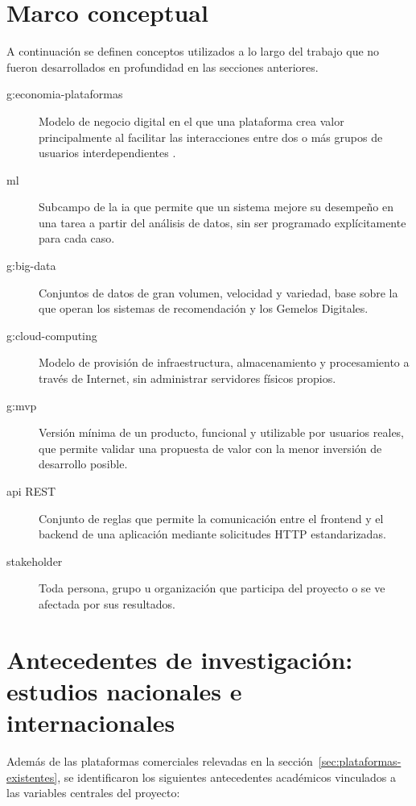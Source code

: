 \section{Marco conceptual}

A continuación se definen conceptos utilizados a lo largo del trabajo que
no fueron desarrollados en profundidad en las secciones anteriores.

\begin{description}
    \item[\Gls{g:economia-plataformas}] Modelo de negocio digital en el
          que una plataforma crea valor principalmente al facilitar las
          interacciones entre dos o más grupos de usuarios
          interdependientes \citep{rochettirole2006}.
    \item[\gls{ml}] Subcampo de la \gls{ia} que permite que un sistema
          mejore su desempeño en una tarea a partir del análisis de
          datos, sin ser programado explícitamente para cada caso.
    \item[\gls{g:big-data}] Conjuntos de datos de gran volumen, velocidad
          y variedad, base sobre la que operan los sistemas de
          recomendación y los Gemelos Digitales.
    \item[\Gls{g:cloud-computing}] Modelo de provisión de infraestructura,
          almacenamiento y procesamiento a través de Internet, sin
          administrar servidores físicos propios.
    \item[\Gls{g:mvp}] Versión mínima de un producto, funcional y
          utilizable por usuarios reales, que permite validar una
          propuesta de valor con la menor inversión de desarrollo
          posible.
    \item[\gls{api} REST] Conjunto de reglas que permite la comunicación
          entre el frontend y el backend de una aplicación mediante
          solicitudes HTTP estandarizadas.
    \item[\Gls{stakeholder}] Toda persona, grupo u organización que
          participa del proyecto o se ve afectada por sus resultados.
\end{description}

\section{Antecedentes de investigación: estudios nacionales e internacionales}

Además de las plataformas comerciales relevadas en la
sección~\ref{sec:plataformas-existentes}, se identificaron los siguientes
antecedentes académicos vinculados a las variables centrales del
proyecto:


